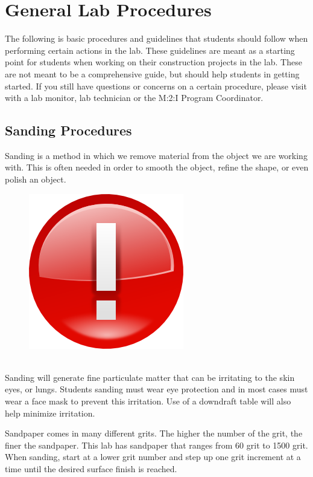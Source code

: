 \chapter{General Lab Procedures}
The following is basic procedures and guidelines that students should follow when performing certain actions in the lab.  These guidelines are meant as a starting point for students when working on their construction projects in the lab.  These are not meant to be a comprehensive guide, but should help students in getting started.  If you still have questions or concerns on a certain procedure, please visit with a lab monitor, lab technician or the M:2:I Program Coordinator.

\section{Sanding Procedures}
Sanding is a method in which we remove material from the object we are working with.  This is often needed in order to smooth the object, refine the shape, or even polish an object.

\begin{framed}
\begin{figure}
\includegraphics[width=\linewidth]{images/important_icon.png}
\end{figure}
\ \\
Sanding will generate fine particulate matter that can be irritating to the skin eyes, or lungs.  Students sanding must wear eye protection and in most cases must wear a face mask to prevent this irritation.  Use of a downdraft table will also help minimize irritation.
\end{framed}
Sandpaper comes in many different grits. The higher the number of the grit, the finer the sandpaper. This lab has sandpaper that ranges from 60 grit to 1500 grit. When sanding, start at a lower grit number and step up one grit increment at a time until the desired surface finish is reached. 

